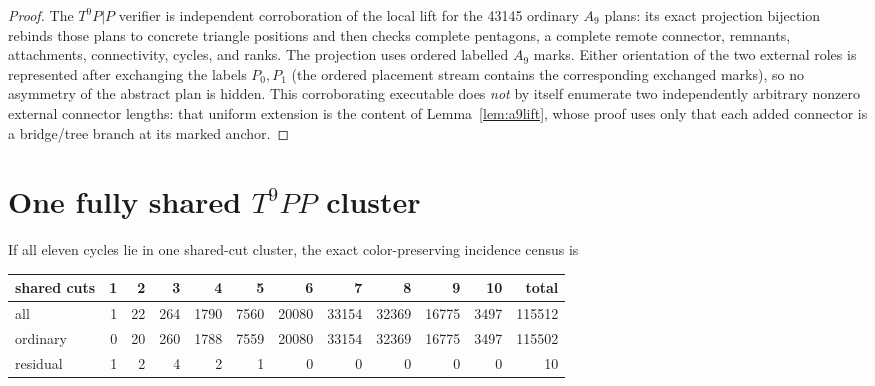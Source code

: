 \documentclass[11pt]{article}
\theoremstyle{remark}
\begin{document}
\begin{proof}
The $T^9P|P$ verifier is independent corroboration of the local lift for the
43145 ordinary $A_9$ plans: its exact projection bijection rebinds those plans
to concrete triangle positions and then checks complete pentagons, a complete
remote connector, remnants, attachments, connectivity, cycles, and ranks.
The projection uses ordered labelled $A_9$ marks.  Either orientation of the
two external roles is represented after exchanging the labels $P_0,P_1$ (the
ordered placement stream contains the corresponding exchanged marks), so no
asymmetry of the abstract plan is hidden.  This corroborating executable does
\emph{not} by itself enumerate two independently arbitrary nonzero external
connector lengths: that uniform extension is the content of
Lemma~\ref{lem:a9lift}, whose proof uses only that each added connector is a
bridge/tree branch at its marked anchor.
\end{proof}

\section{One fully shared \texorpdfstring{$T^9PP$}{T9PP} cluster}

If all eleven cycles lie in one shared-cut cluster, the exact color-preserving
incidence census is
\begin{center}
\small
\begin{tabular}{lrrrrrrrrrr|r}
\toprule
shared cuts&1&2&3&4&5&6&7&8&9&10&total\\
\midrule
all&1&22&264&1790&7560&20080&33154&32369&16775&3497&115512\\
ordinary&0&20&260&1788&7559&20080&33154&32369&16775&3497&115502\\
residual&1&2&4&2&1&0&0&0&0&0&10\\
\bottomrule
\end{tabular}
\end{center}
\end{document}
